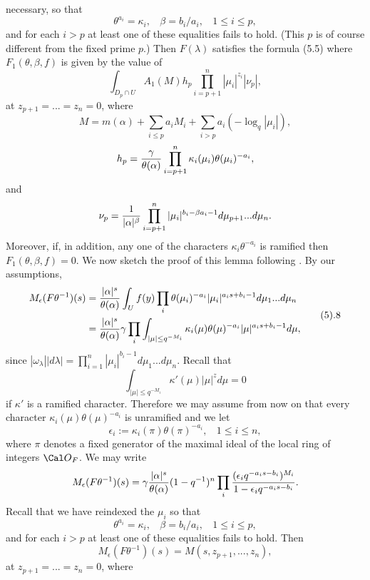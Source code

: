 necessary, so that 
$$
\theta^{a_i}=\kappa_i,\ \ \ \ \beta=b_i/a_i,\ \ \ \ 
1\leq i\leq p,
$$
and for each $i>p$ at least one of these equalities fails to hold.
(This $p$ is of course different from the fixed prime $p$.)
Then $F(\lambda)$ satisfies the formula (5.5)
where $F_1(\theta,\beta,f)$ is given by the value of
$$
\int_{D_p\cap U}A_1(M)h_p\prod_{i=p+1}^n|\mu_i|^{z_i}|\nu_p|,
$$
at $z_{p+1}=...=z_n=0$, where
$$
M=m(\alpha)+\sum_{i\leq p}a_iM_i +\sum_{i>p}a_i(-\log_q|\mu_i|),
$$
$$
h_p={\gamma\over \theta(\alpha)}
\prod_{i=p+1}^n\kappa_i(\mu_i)\theta(\mu_i)^{-a_i},
$$
and 
$$
\nu_p={1\over |\alpha|^\beta}
\prod_{i=p+1}^n|\mu_i|^{b_i-\beta a_i-1}d\mu_{p+1}...d\mu_n.
$$
Moreover, if, in addition, any one of the characters $\kappa_i\theta^{-a_i}$
is ramified then $F_1(\theta,\beta,f)=0$.
\endproclaim
We now sketch the proof of this lemma following \cite{L}.
By our assumptions,
$$
\split
M_\epsilon (F\theta^{-1})(s)
&={|\alpha|^s\over \theta(\alpha)}
\int_Uf(y)\prod_i\theta(\mu_i)^{-a_i}|\mu_i|^{a_is+b_i-1}
d\mu_1...d\mu_n\\
&={|\alpha|^s\over \theta(\alpha)}\gamma
\prod_i\int_{|\mu|\leq q^{-M_i}}
\kappa_i(\mu)\theta(\mu)^{-a_i}|\mu|^{a_is+b_i-1}d\mu,
\endsplit
\tag 5.8
$$
since $|\omega_\lambda ||d\lambda |
=\prod_{i=1}^n|\mu_i|^{b_i-1}d\mu_1...d\mu_n$.
Recall that 
$$
\int_{|\mu|\leq q^{-M_i}}
\kappa'(\mu)|\mu|^zd\mu =0
$$
if $\kappa'$ is a ramified character. Therefore we may assume 
from now on that every character $\kappa_i(\mu)\theta(\mu)^{-a_i}$
is unramified and we let
$$
\epsilon_i:=\kappa_i(\pi)\theta(\pi)^{-a_i},\ \ \ \ 
1\leq i\leq n,
$$
where $\pi$ denotes a fixed generator of the maximal ideal
of the local ring of integers ${\Cal O}_F$. We may write
$$
M_\epsilon (F\theta^{-1})(s)
=\gamma{|\alpha|^s\over \theta(\alpha)}
(1-q^{-1})^n\prod_i
{(\epsilon_iq^{-a_is-b_i})^{M_i}\over 
1-\epsilon_iq^{-a_is-b_i}}.
$$
Recall that we have reindexed the $\mu_i$ so that 
$$
\theta^{a_i}=\kappa_i,\ \ \ \ \beta=b_i/a_i,\ \ \ \ 
1\leq i\leq p,
$$
and for each $i>p$ at least one of these equalities fails to hold.
Then
$$
M_\epsilon (F\theta^{-1})(s)
=M(s,z_{p+1},...,z_n),
$$
at $z_{p+1}=...=z_n=0$, where

